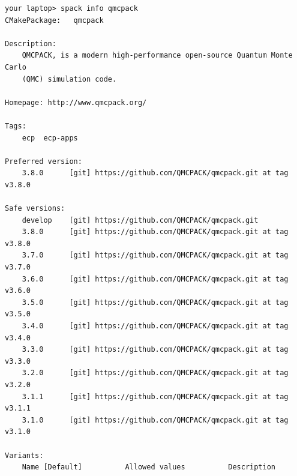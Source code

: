\begin{lstlisting}[style=SHELL]
your laptop> spack info qmcpack
CMakePackage:   qmcpack

Description:
    QMCPACK, is a modern high-performance open-source Quantum Monte Carlo
    (QMC) simulation code.

Homepage: http://www.qmcpack.org/

Tags: 
    ecp  ecp-apps

Preferred version:  
    3.8.0      [git] https://github.com/QMCPACK/qmcpack.git at tag v3.8.0

Safe versions:  
    develop    [git] https://github.com/QMCPACK/qmcpack.git
    3.8.0      [git] https://github.com/QMCPACK/qmcpack.git at tag v3.8.0
    3.7.0      [git] https://github.com/QMCPACK/qmcpack.git at tag v3.7.0
    3.6.0      [git] https://github.com/QMCPACK/qmcpack.git at tag v3.6.0
    3.5.0      [git] https://github.com/QMCPACK/qmcpack.git at tag v3.5.0
    3.4.0      [git] https://github.com/QMCPACK/qmcpack.git at tag v3.4.0
    3.3.0      [git] https://github.com/QMCPACK/qmcpack.git at tag v3.3.0
    3.2.0      [git] https://github.com/QMCPACK/qmcpack.git at tag v3.2.0
    3.1.1      [git] https://github.com/QMCPACK/qmcpack.git at tag v3.1.1
    3.1.0      [git] https://github.com/QMCPACK/qmcpack.git at tag v3.1.0

Variants:
    Name [Default]          Allowed values          Description



\end{lstlisting}
